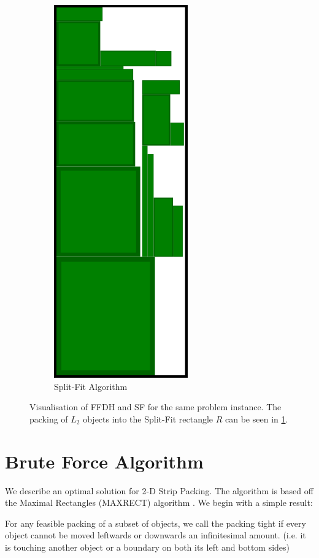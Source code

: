 \documentclass{article}
\begin{document}
\begin{figure}[ht]
\begin{subfigure}{.35\textwidth}
  \includegraphics[width=.5\linewidth]{SplitFitrun.png}
  \caption{Split-Fit Algorithm}
  \label{fig:splitfitrun}
\end{subfigure}
  \caption{Visualisation of FFDH and SF for the same problem instance. The packing of $L_2$ objects into the Split-Fit rectangle $R$ can be seen in \ref{fig:splitfitrun}.}
  \label{fig:ffdhsfrun}
\end{figure}


\section{Brute Force Algorithm}
We describe an optimal solution for 2-D Strip Packing. The algorithm is based off the Maximal Rectangles (MAXRECT) algorithm \cite{maxrects}. We begin with a simple result:

\begin{defn}
For any feasible packing of a subset of objects, we call the packing tight if every object cannot be moved leftwards or downwards an infinitesimal amount. (i.e. it is touching another object or a boundary on both its left and bottom sides)
\end{defn}
\end{document}
